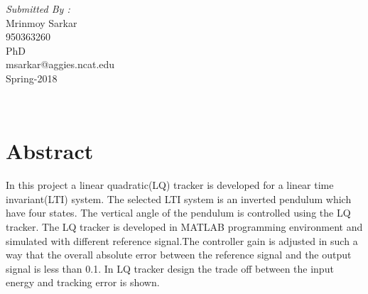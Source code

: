 \documentclass[12pt]{article}
\begin{document}
\begin{titlepage}
\begin{minipage}{0.4\textwidth}
			\begin{flushright} \large
			\emph{Submitted By :} \\
			Mrinmoy Sarkar\\
            950363260\\
            PhD\\
            msarkar@aggies.ncat.edu\\
            Spring-2018\\
            
		\end{flushright}
        
	\end{minipage}\\[2 cm]
	
	
    
    
    
    
	
\end{titlepage}
\section{Abstract}
In this project a linear quadratic(LQ) tracker is developed for a linear time invariant(LTI) system. The selected LTI system is an inverted pendulum which have four states. The vertical angle of the pendulum is controlled using the LQ tracker. The LQ tracker is developed in MATLAB programming environment and simulated with different reference signal.The controller gain is adjusted in such a way that the overall absolute error between the reference signal and the output signal is less than 0.1. In LQ tracker design the trade off between the input energy and tracking error is shown.
\newpage


\tableofcontents
\pagebreak

\end{document}
